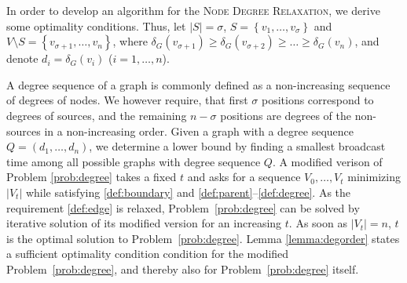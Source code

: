 
In order to develop an algorithm for the \textsc{Node Degree Relaxation}, we derive some optimality conditions.
Thus, let $|S|=\sigma$, $S=\left\{v_1,\dots,v_{\sigma}\right\}$ and $V\setminus S=\left\{v_{\sigma+1},\ldots,v_n\right\}$, where $\delta_G(v_{\sigma+1})\geq\delta_G(v_{\sigma+2})\geq\dots\geq\delta_G(v_n)$,
and denote $d_i=\delta_G(v_i)$ ($i=1,\ldots,n$).

A degree sequence of a graph is commonly defined as a non-increasing sequence of degrees of nodes.
We however require, that first $\sigma$ positions correspond to degrees of sources, 
and the remaining $n-\sigma$ positions are degrees of the non-sources in a non-increasing order.
Given a graph with a degree sequence 
$Q=(d_1,\dots,d_n)$, we determine a lower bound by finding a smallest broadcast time among all possible graphs with degree sequence $Q$.
A modified verison of Problem \ref{prob:degree} takes a fixed $t$ and asks for a sequence $V_0,\dots,V_t$ minimizing $|V_t|$ while satisfying \ref{def:boundary} and \ref{def:parent}--\ref{def:degree}.
As the requirement \ref{def:edge} is relaxed, Problem~\ref{prob:degree} can be solved by iterative solution of its modified version for an increasing $t$.
As soon as $|V_t|=n$, $t$ is the optimal solution to Problem~\ref{prob:degree}.
Lemma \ref{lemma:degorder} states a sufficient optimality condition condition for the modified Problem~\ref{prob:degree}, and thereby also for Problem~\ref{prob:degree} itself.

